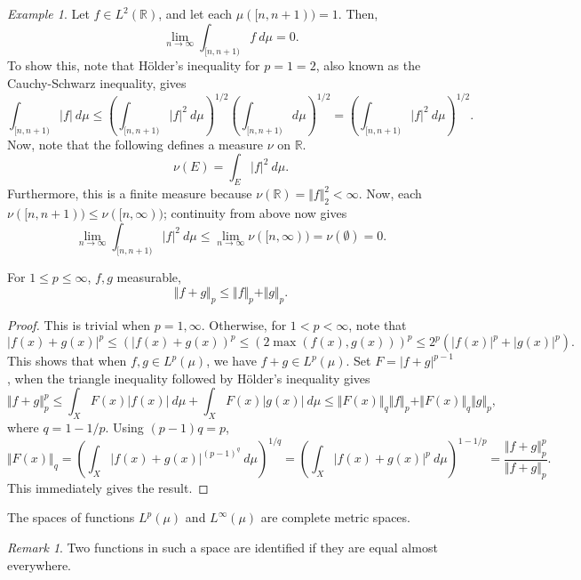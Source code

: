 \documentclass[11pt]{article}
\newcommand{\R}{\mathbb{R}}
\newcommand{\norm}[1]{\Vert #1 \Vert}
\theoremstyle{definition}
\theoremstyle{remark}
\newtheorem*{remark}{Remark}
\newtheorem*{example}{Example}
\numberwithin{equation}{section}
\begin{document}
    \begin{example}
        Let $f \in L^2(\R)$, and let each $\mu([n, n + 1)) = 1$. Then, \[
            \lim_{n \to \infty} \int_{[n, n + 1)} f\:d\mu = 0.
        \] To show this, note that H\"older's inequality for $p = 1 = 2$, also known
        as the Cauchy-Schwarz inequality, gives \[
            \int_{[n, n + 1)} |f|\:d\mu \leq \left(\int_{[n, n +
            1)}|f|^2\:d\mu\right)^{1 / 2}\left(\int_{[n, n + 1)}d\mu\right)^{1 / 2} =
            \left(\int_{[n, n + 1)} |f|^2\:d\mu\right)^{1 / 2}.
        \] Now, note that the following defines a measure $\nu$ on $\R$. \[
            \nu(E) = \int_E |f|^2\:d\mu.
        \] Furthermore, this is a finite measure because $\nu(\R) = \norm{f}_2^2 <
        \infty$. Now, each $\nu([n, n + 1)) \leq \nu([n, \infty))$; continuity
        from above now gives \[
            \lim_{n \to \infty} \int_{[n, n + 1)} |f|^2\:d\mu \leq \lim_{n \to
            \infty} \nu([n, \infty)) = \nu(\emptyset) = 0.
        \]
    \end{example}

    \begin{lemma}[Minkowski]
        For $1 \leq p \leq \infty$, $f, g$ measurable, \[
            \norm{f + g}_p \leq \norm{f}_p + \norm{g}_p.
        \]
    \end{lemma}
    \begin{proof}
        This is trivial when $p = 1, \infty$. Otherwise, for $1 < p < \infty$, note
        that \[
            |f(x) + g(x)|^p \leq \left(|f(x) + g(x)\right)^p \leq \left(2\max(f(x),
            g(x))\right)^p \leq 2^p\left(|f(x)|^p + |g(x)|^p\right).
        \] This shows that when $f, g \in L^p(\mu)$, we have $f + g \in L^p(\mu)$.
        Set $F = |f + g|^{p - 1}$, when the triangle inequality followed by
        H\"older's inequality gives \[
            \norm{f + g}_p^p \leq \int_X F(x)|f(x)|\:d\mu + \int_X F(x)|g(x)|\:d\mu
            \leq \norm{F(x)}_q\norm{f}_p + \norm{F(x)}_q\norm{g}_p,
        \] where $q = 1 - 1 /p$. Using $(p - 1)q = p$, \[
            \norm{F(x)}_q = \left(\int_X |f(x) + g(x)|^{(p - 1)^q} \:d\mu\right)^{1 /
            q} = \left(\int_X |f(x) + g(x)|^p \:d\mu\right)^{1 - 1 / p} =
            \frac{\norm{f + g}_p^p}{\norm{f + g}_p}.
        \] This immediately gives the result.
    \end{proof}

    \begin{theorem}
        The spaces of functions $L^p(\mu)$ and $L^\infty(\mu)$ are complete metric
        spaces.
        \begin{remark}
            Two functions in such a space are identified if they are equal almost
            everywhere.
        \end{remark}
    \end{theorem}
\end{document}
